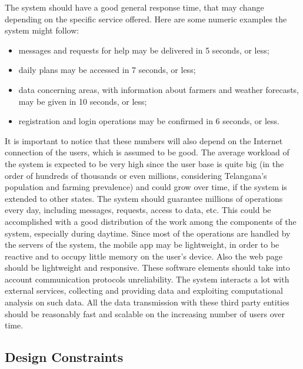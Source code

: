 The system should have a good general response time, that may change depending on the specific service offered. Here are some numeric examples the system might follow:
\begin{itemize}
    \item messages and requests for help may be delivered in 5 seconds, or less;
    \item daily plans may be accessed in 7 seconds, or less;
    \item data concerning areas, with information about farmers and weather forecasts, may be given in 10 seconds, or less;
    \item registration and login operations may be confirmed in 6 seconds, or less.
\end{itemize}
It is important to notice that these numbers will also depend on the Internet connection of the users, which is assumed to be good.
\newline
\newline
The average workload of the system is expected to be very high since the user base is quite big (in the order of hundreds of thousands or even millions, considering Telangana’s population and farming prevalence) and could grow over time, if the system is extended to other states. The system should guarantee millions of operations every day, including messages, requests, access to data, etc. This could be accomplished with a good distribution of the work among the components of the system, especially during daytime. 
\newline
\newline
Since most of the operations are handled by the servers of the system, the mobile app may be lightweight, in order to be reactive and to occupy little memory on the user’s device. Also the web page should be lightweight and responsive. These software elements should take into account communication protocols unreliability.
\newline
\newline
The system interacts a lot with external services, collecting and providing data and exploiting computational analysis on such data. All the data transmission with these third party entities should be reasonably fast and scalable on the increasing number of users over time.


\subsection{Design Constraints}

